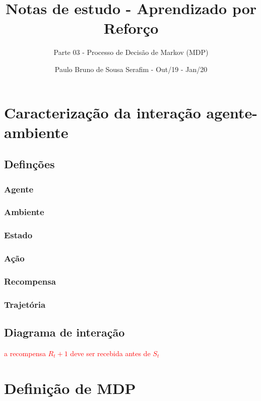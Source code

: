 \documentclass{article}
\title{Notas de estudo - Aprendizado por Reforço}
\author{Parte 03 - Processo de Decisão de Markov (MDP)}
\date{Paulo Bruno de Sousa Serafim - Out/19 - Jan/20}
\begin{document}
\maketitle

    \section{Caracterização da interação agente-ambiente}
    
        \subsection{Definções}
            
            \subsubsection{Agente}
            \subsubsection{Ambiente}
            \subsubsection{Estado}
            \subsubsection{Ação}
            \subsubsection{Recompensa}
            \subsubsection{Trajetória}
            
        \subsection{Diagrama de interação}
        
            \textcolor{red}{a recompensa $R_t+1$ deve ser recebida antes de $S_t$}
        
            \begin{center}
                \rlinteraction
            \end{center}
            
    \section{Definição de MDP}
    
\end{document}
